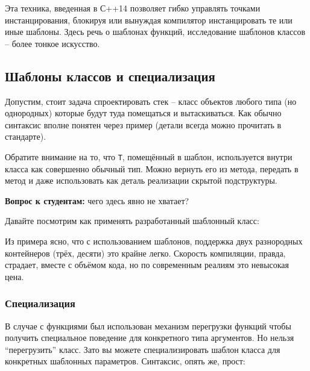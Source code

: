 \documentclass[a4paper,12pt,oneside]{article}
\newif\ifanswers
\begin{document}
Эта техника, введенная в С++14 позволяет гибко управлять точками инстанцирования, блокируя или вынуждая компилятор инстанцировать те или иные шаблоны. Здесь речь о шаблонах функций, исследование шаблонов классов -- более тонкое искусство.

\pagebreak
\subsection{Шаблоны классов и специализация}\label{ClassTemplates}

Допустим, стоит задача спроектировать стек – класс объектов любого типа (но однородных) которые будут туда помещаться и вытаскиваться. Как обычно синтаксис вполне понятен через пример (детали всегда можно прочитать в стандарте).



Обратите внимание на то, что \lstinline!T!, помещённый в шаблон, используется внутри класса как совершенно обычный тип. Можно вернуть его из метода, передать в метод и даже использовать как деталь реализации скрытой подструктуры.



\textbf{Вопрос к студентам:} чего здесь явно не хватает?

\ifanswers
Ожидается хоровой ответ: деструктор, копирующий конструктор и оператор присваивания. Позвать кого-нибудь к доске разобрать как их писать.
\fi

Давайте посмотрим как применять разработанный шаблонный класс:



Из примера ясно, что с использованием шаблонов, поддержка двух разнородных контейнеров (трёх, десяти) это крайне легко. Скорость компиляции, правда, страдает, вместе с объёмом кода, но по современным реалиям это невысокая цена.

\subsubsection{Специализация}\label{TemplateSpec}

В случае с функциями был использован механизм перегрузки функций чтобы получить специальное поведение для конкретного типа аргументов. Но нельзя ``перегрузить'' класс. Зато вы можете специализировать шаблон класса для конкретных шаблонных параметров. Синтаксис, опять же, прост:
\end{document}
